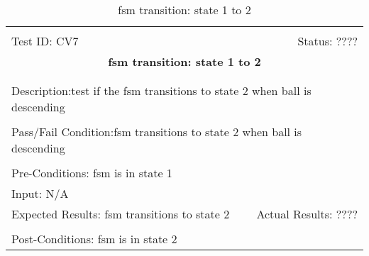 \documentclass[11pt]{article}
\begin{document}
\begin{center}
\begin{table}[H]
\begin{tabular}{|l r|}\hline&\\[-2mm]
	Test ID: CV7	&Status: ????\\[-3mm]
	\multicolumn{2}{|c|}{\textbf{\large{fsm transition: state 1 to 2}}}\\&\\\hline&\\[-3mm]
	\multicolumn{2}{|p{\textwidth}|}{Description:test if the fsm transitions to state 2 when ball is descending}\\[1mm]\hline&\\[-3mm]
	\multicolumn{2}{|p{\textwidth}|}{Pass/Fail Condition:fsm transitions to state 2 when ball is descending }\\[1mm]\hline&\\[-3mm]
	\multicolumn{2}{|p{\textwidth}|}{Pre-Conditions: fsm is in state 1}\\[4mm]
	\multicolumn{2}{|p{\textwidth}|}{Input: N/A}\\[2mm]\hline
	\multicolumn{1}{|p{0.49\textwidth}}{Expected Results: fsm transitions to state 2}	&\multicolumn{1}{|p{0.45\textwidth}|}{Actual Results: ????}\\\hline&\\[-3mm]
	\multicolumn{2}{|p{\textwidth}|}{Post-Conditions: fsm is in state 2}\\\hline
\end{tabular}
\caption{fsm transition: state 1 to 2}
\end{table}
\end{center}
\end{document}
